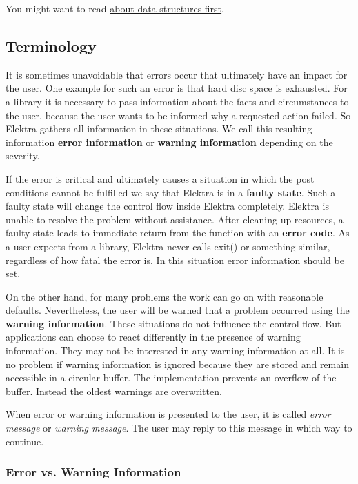 You might want to read \hyperlink{doc_dev_data-structures_md}{about data structures first}.

\subsection*{Terminology}

It is sometimes unavoidable that errors occur that ultimately have an impact for the user. One example for such an error is that hard disc space is exhausted. For a library it is necessary to pass information about the facts and circumstances to the user, because the user wants to be informed why a requested action failed. So Elektra gathers all information in these situations. We call this resulting information {\bfseries error information} or {\bfseries warning information} depending on the severity.

If the error is critical and ultimately causes a situation in which the post conditions cannot be fulfilled we say that Elektra is in a {\bfseries faulty state}. Such a faulty state will change the control flow inside Elektra completely. Elektra is unable to resolve the problem without assistance. After cleaning up resources, a faulty state leads to immediate return from the function with an {\bfseries error code}. As a user expects from a library, Elektra never calls {\ttfamily exit()} or something similar, regardless of how fatal the error is. In this situation error information should be set.

On the other hand, for many problems the work can go on with reasonable defaults. Nevertheless, the user will be warned that a problem occurred using the {\bfseries warning information}. These situations do not influence the control flow. But applications can choose to react differently in the presence of warning information. They may not be interested in any warning information at all. It is no problem if warning information is ignored because they are stored and remain accessible in a circular buffer. The implementation prevents an overflow of the buffer. Instead the oldest warnings are overwritten.

When error or warning information is presented to the user, it is called {\itshape error message} or {\itshape warning message}. The user may reply to this message in which way to continue.

\subsubsection*{Error vs. Warning Information}

